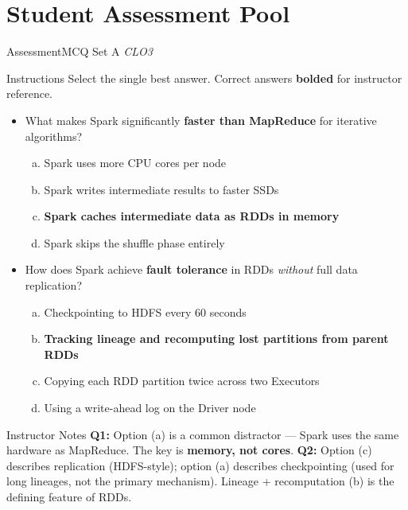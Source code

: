 \documentclass[aspectratio=169,10pt]{beamer}
\begin{document}
\section{Student Assessment Pool}

\begin{frame}{Assessment\textemdash MCQ Set A \hfill\small\textit{CLO3}}
  \begin{exampleblock}{Instructions}
    Select the single best answer.  Correct answers \textbf{bolded} for instructor reference.
  \end{exampleblock}
  \vspace{8pt}
  \begin{itemize}
    \item[\textbf{Q1.}] What makes Spark significantly \textbf{faster than MapReduce} for iterative algorithms?
    \begin{enumerate}[(a)]
      \item Spark uses more CPU cores per node
      \item Spark writes intermediate results to faster SSDs
      \item \textbf{Spark caches intermediate data as RDDs in memory}
      \item Spark skips the shuffle phase entirely
    \end{enumerate}
  \end{itemize}
  \vspace{8pt}
  \begin{itemize}
    \item[\textbf{Q2.}] How does Spark achieve \textbf{fault tolerance} in RDDs \emph{without} full data replication?
    \begin{enumerate}[(a)]
      \item Checkpointing to HDFS every 60 seconds
      \item \textbf{Tracking lineage and recomputing lost partitions from parent RDDs}
      \item Copying each RDD partition twice across two Executors
      \item Using a write-ahead log on the Driver node
    \end{enumerate}
  \end{itemize}
  \vspace{8pt}
  \begin{alertblock}{Instructor Notes}
    \textbf{Q1:} Option (a) is a common distractor — Spark uses the same hardware as MapReduce.  The key is \textbf{memory, not cores}.  \textbf{Q2:} Option (c) describes replication (HDFS-style); option (a) describes checkpointing (used for long lineages, not the primary mechanism).  Lineage + recomputation (b) is the defining feature of RDDs.
  \end{alertblock}
\end{frame}
\end{document}
